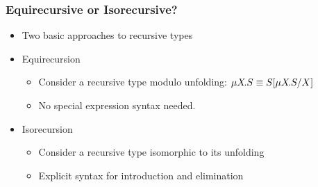 \documentclass[aspectratio=169]{beamer}
\begin{document}
\begin{frame}
  \frametitle{Equirecursive or Isorecursive?}
  \begin{itemize}
  \item<+-> Two basic approaches to recursive types
  \item<+-> Equirecursion
    \begin{itemize}
    \item Consider a recursive type modulo unfolding: $\TRec S \equiv
      S[\TRec S/ X]$
    \item No special expression syntax needed.
    \end{itemize}
  \item<+-> Isorecursion
    \begin{itemize}
    \item Consider a recursive type isomorphic to its unfolding
    \item Explicit syntax for introduction and elimination
      \begin{mathpar}

      \end{mathpar}
    \end{itemize}
  \end{itemize}
\end{frame}
\end{document}
